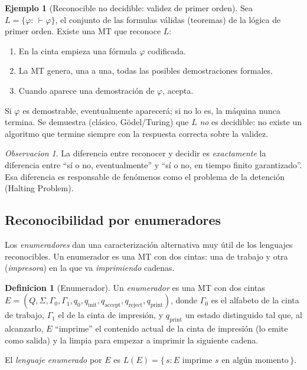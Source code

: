 \documentclass[11pt,a4paper]{article}
\theoremstyle{plain}
\theoremstyle{definition}
\newtheorem{definicion}[teorema]{Definicion}
\newtheorem{ejemplo}[teorema]{Ejemplo}
\theoremstyle{remark}
\newtheorem*{observacion}{Observacion}
\newcommand{\qaccept}{q_{\text{accept}}}
\newcommand{\qreject}{q_{\text{reject}}}
\begin{document}
\begin{ejemplo}[Reconocible no decidible: validez de primer orden]
Sea $L=\{\varphi : \,\vdash\varphi\}$, el conjunto de las formulas
v\'alidas (teoremas) de la l\'ogica de primer orden. Existe una MT que
reconoce $L$:
\begin{enumerate}
  \item En la cinta empieza una f\'ormula $\varphi$ codificada.
  \item La MT genera, una a una, todas las posibles demostraciones formales.
  \item Cuando aparece una demostraci\'on de $\varphi$, acepta.
\end{enumerate}
Si $\varphi$ es demostrable, eventualmente aparecer\'a; si no lo es, la
m\'aquina nunca termina. Se demuestra (cl\'asico, G\"odel/Turing) que $L$
\emph{no} es decidible: no existe un algoritmo que termine siempre con la
respuesta correcta sobre la validez.
\end{ejemplo}

\begin{observacion}
La diferencia entre reconocer y decidir es \emph{exactamente} la diferencia
entre ``s\'i o no, eventualmente'' y ``s\'i o no, en tiempo finito
garantizado''. Esa diferencia es responsable de fen\'omenos como el
problema de la detenci\'on (Halting Problem).
\end{observacion}

\subsection{Reconocibilidad por enumeradores}

Los \emph{enumeradores} dan una caracterizaci\'on alternativa muy \'util de
los lenguajes reconocibles. Un enumerador es una MT con dos cintas: una de
trabajo y otra (\emph{impresora}) en la que va \emph{imprimiendo} cadenas.

\begin{definicion}[Enumerador]
\label{def:enumerador}
Un \emph{enumerador} es una MT con dos cintas
$E=(Q,\Sigma,\Gamma_0,\Gamma_1,q_0,q_{\text{init}},\qaccept,\qreject,q_{\text{print}})$,
donde $\Gamma_0$ es el alfabeto de la cinta de trabajo, $\Gamma_1$ el de la
cinta de impresi\'on, y $q_{\text{print}}$ un estado distinguido tal que,
al alcanzarlo, $E$ ``imprime'' el contenido actual de la cinta de
impresi\'on (lo emite como salida) y la limpia para empezar a imprimir la
siguiente cadena.

El \emph{lenguaje enumerado} por $E$ es
\(L(E) = \{\,s : E \text{ imprime } s \text{ en alg\'un momento}\,\}.\)
\end{definicion}
\end{document}
